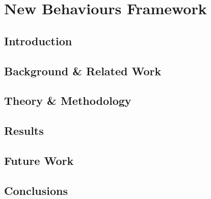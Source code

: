\chapter{New Behaviours Framework}
\label{chap:rl}

\section{Introduction}
\section{Background \& Related Work}
\section{Theory \& Methodology}
\section{Results}
\section{Future Work}
\section{Conclusions}
